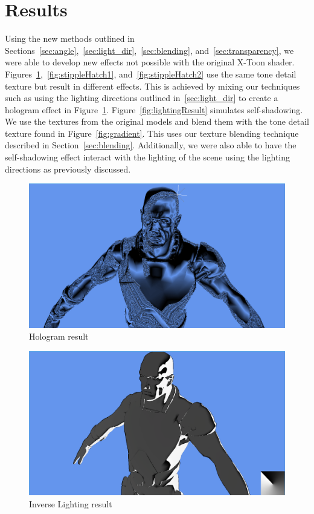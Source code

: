 \documentclass[annual]{acmsiggraph}
\begin{document}
\section{Results}
\label{sec:results}
Using the new methods outlined in Sections~\ref{sec:angle},~\ref{sec:light_dir},~\ref{sec:blending}, and~\ref{sec:transparency}, we were able to develop new effects not possible with the original X-Toon shader. Figures~\ref{fig:hologram},~\ref{fig:stippleHatch1}, and~\ref{fig:stippleHatch2} use the same tone detail texture but result in different effects. This is achieved by mixing our techniques such as using the lighting directions outlined in~\ref{sec:light_dir} to create a hologram effect in Figure~\ref{fig:hologram}. Figure~\ref{fig:lightingResult} simulates self-shadowing. We use the textures from the original models and blend them with the tone detail texture found in Figure~\ref{fig:gradient}. This uses our texture blending technique described in Section~\ref{sec:blending}. Additionally, we were also able to have the self-shadowing effect interact with the lighting of the scene using the lighting directions as previously discussed.

\begin{figure}[h]
	\centering
	\includegraphics[width=5.5in]{images/hologram}
	\caption{Hologram result}
	\label{fig:hologram}
\end{figure}

\begin{figure}[h]
	\centering
	\includegraphics[width=5.5in]{images/inverse_lighting}
	\caption{Inverse Lighting result}
	\label{fig:inverseLighting}
\end{figure}
\end{document}
